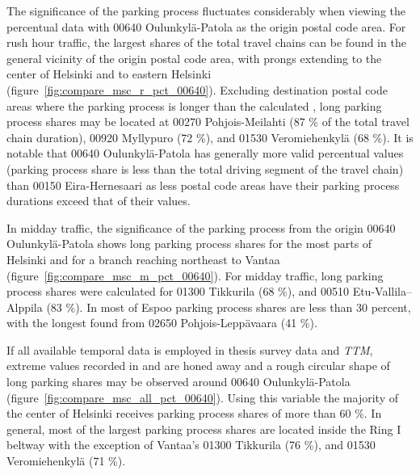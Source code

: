 The significance of the parking process fluctuates considerably when viewing the percentual data with 00640 Oulunkylä-Patola as the origin postal code area. For rush hour traffic, the largest shares of the total travel chains can be found in the general vicinity of the origin postal code area, with prongs extending to the center of Helsinki and to eastern Helsinki (figure~\ref{fig:compare_msc_r_pct_00640}). Excluding destination postal code areas where the parking process is longer than the calculated , long parking process shares may be located at 00270 Pohjois-Meilahti (87 \% of the total travel chain duration), 00920 Myllypuro (72 \%), and 01530 Veromiehenkylä (68 \%). It is notable that 00640 Oulunkylä-Patola has generally more valid percentual values (parking process share is less than the total driving segment of the travel chain) than 00150 Eira-Hernesaari as less postal code areas have their parking process durations exceed that of their  values.

In midday traffic, the significance of the parking process from the origin 00640 Oulunkylä-Patola shows long parking process shares for the most parts of Helsinki and for a branch reaching northeast to Vantaa (figure~\ref{fig:compare_msc_m_pct_00640}). For midday traffic, long parking process shares were calculated for 01300 Tikkurila (68 \%), and 00510 Etu-Vallila--Alppila (83 \%). In most of Espoo parking process shares are less than 30 percent, with the longest found from 02650 Pohjois-Leppävaara (41 \%).

If all available temporal data is employed in thesis survey data and \textit{TTM}, extreme values recorded in  and  are honed away and a rough circular shape of long parking shares may be observed around 00640 Oulunkylä-Patola (figure~\ref{fig:compare_msc_all_pct_00640}). Using this variable the majority of the center of Helsinki receives parking process shares of more than 60 \%. In general, most of the largest parking process shares are located inside the Ring I beltway with the exception of Vantaa's 01300 Tikkurila (76 \%), and 01530 Veromiehenkylä (71 \%).

